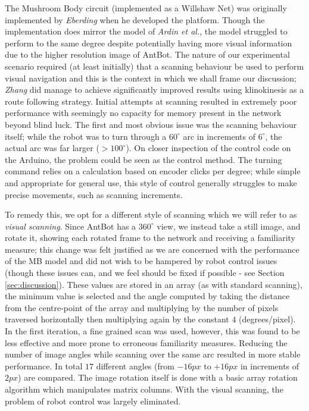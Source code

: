 \documentclass[a4paper,12pt,twoside,openright]{article}
\begin{document}
The Mushroom Body circuit (implemented as a Willshaw Net) was originally implemented by \textit{Eberding} when he
developed the platform. Though the implementation does mirror the model of \textit{Ardin et al.}, the model
struggled to perform to the same degree despite potentially having more visual information due to the higher resolution
image of AntBot. The nature of our experimental scenario required (at least initially) that a scanning behaviour be used
to perform visual navigation and this is the context in which we shall frame our discussion; \textit{Zhang}
did manage to achieve significantly improved results using klinokinesis as a route following strategy. Initial attempts
at scanning resulted in extremely poor performance with seemingly no capacity for memory present in the network beyond
blind luck. The first and most obvious issue was the scanning behaviour itself; while the robot was to turn through a
$60^{\circ}$ arc in increments of $6^{\circ}$, the actual arc was far larger ($> 100^{\circ}$). On closer inspection of the
control code on the Arduino, the problem could be seen as the control method. The turning command relies on a calculation
based on encoder clicks per degree; while simple and appropriate for general use, this style of control generally struggles
to make precise movements, such as scanning increments.
\newline

To remedy this, we opt for a different style of scanning which
we will refer to as \textit{visual scanning}. Since AntBot has a $360^{\circ}$ view, we instead take a still image, and rotate
it, showing each rotated frame to the network and receiving a familiarity measure; this change was felt justified as we are
concerned with the performance of the MB model and did not wish to be hampered by robot control issues (though these issues
can, and we feel should be fixed if possible - see Section \ref{sec:discussion}). These values are stored in an array (as
with standard scanning), the minimum value is selected and the angle computed by taking the distance from the centre-point
of the array and multiplying by the number of pixels traversed horizontally then multiplying again by the constant $4$ (degrees/pixel).
In the first iteration, a fine grained scan was used, however, this was found to be less effective and more prone to erroneous
familiarity measures. Reducing the number of image angles while scanning over the same arc resulted in more stable performance. In total
$17$ different angles (from $-16px$ to $+16px$ in increments of $2px$) are compared. The image rotation itself is done with
a basic array rotation algorithm which manipulates matrix columns. With the visual scanning, the problem of robot
control was largely eliminated. 
\newline
\end{document}

